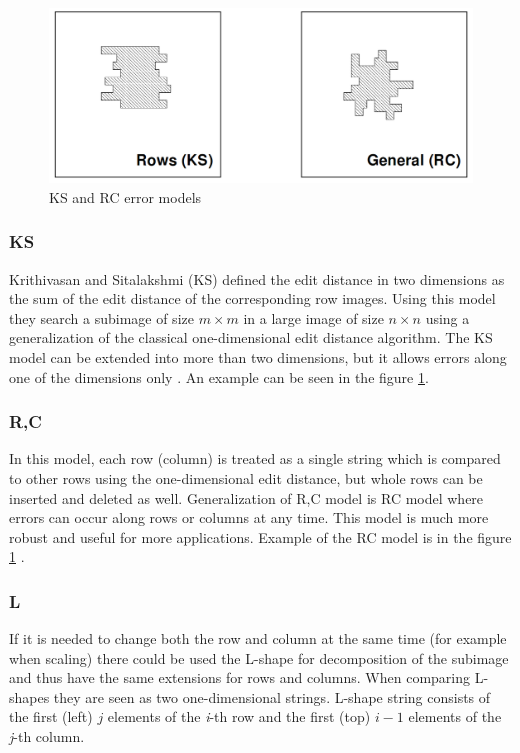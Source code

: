 \begin{figure}
\centering
\includegraphics[scale=0.3]{RC_KS.png}
\caption{KS and RC error models \cite{mdApproxPM}}
\label{ks_rc}
\end{figure}


\subsubsection{KS}\label{ks}
Krithivasan and Sitalakshmi (KS) defined the edit distance in two dimensions as the sum of the edit distance of the corresponding row images. Using this model they search a subimage of size $m \times m$ in a large image of size $n \times n$ using a generalization of the classical one-dimensional edit distance algorithm.
The KS model can be extended into more than two dimensions, but it allows errors along one of the dimensions only \cite{mdApproxPM}.
An example can be seen in the figure \ref{ks_rc}.

\subsubsection{R,C}
In this model, each row (column) is treated as a single string which is compared to other rows using the one-dimensional edit distance, but 
whole rows can be inserted and deleted as well.
Generalization of R,C model is RC model where errors can occur along rows or columns at any time. This model is much more robust and useful for more applications. Example of the RC model is in the figure \ref{ks_rc} \cite{mdApproxPM}.

\subsubsection{L}
If it is needed to change both the row and column at the same time (for example when scaling) there could be used the L-shape for decomposition of the subimage and thus have the same extensions for rows and columns. When comparing L-shapes they are seen as two one-dimensional strings. L-shape string consists of the first (left) $j$ elements of the \textit{i}-th row and the first (top) $i-1$ elements of the \textit{j}-th column.

